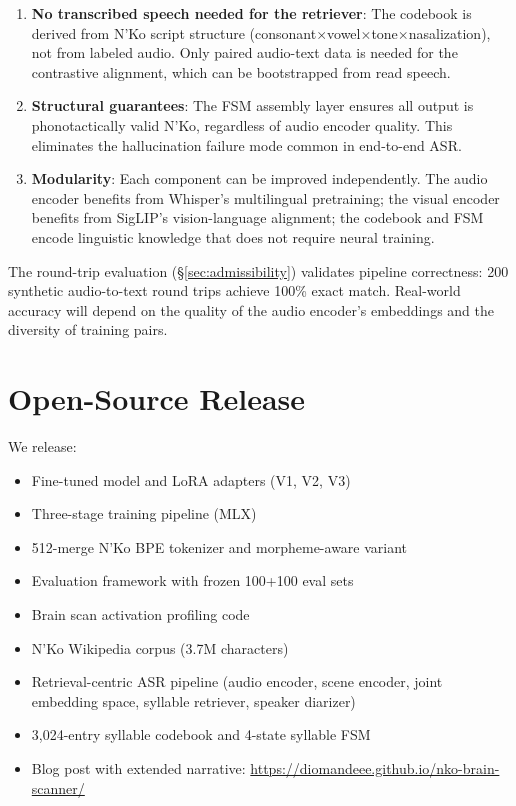 \documentclass[11pt]{article}
\begin{document}
\begin{enumerate}
\item \textbf{No transcribed speech needed for the retriever}: The codebook is derived from N'Ko script structure (consonant$\times$vowel$\times$tone$\times$nasalization), not from labeled audio. Only paired audio-text data is needed for the contrastive alignment, which can be bootstrapped from read speech.

\item \textbf{Structural guarantees}: The FSM assembly layer ensures all output is phonotactically valid N'Ko, regardless of audio encoder quality. This eliminates the hallucination failure mode common in end-to-end ASR.

\item \textbf{Modularity}: Each component can be improved independently. The audio encoder benefits from Whisper's multilingual pretraining; the visual encoder benefits from SigLIP's vision-language alignment; the codebook and FSM encode linguistic knowledge that does not require neural training.
\end{enumerate}

The round-trip evaluation (\S\ref{sec:admissibility}) validates pipeline correctness: 200 synthetic audio-to-text round trips achieve 100\% exact match. Real-world accuracy will depend on the quality of the audio encoder's embeddings and the diversity of training pairs.

\section{Open-Source Release}
\label{sec:release}

We release:
\begin{itemize}
\item Fine-tuned model and LoRA adapters (V1, V2, V3)
\item Three-stage training pipeline (MLX)
\item 512-merge N'Ko BPE tokenizer and morpheme-aware variant
\item Evaluation framework with frozen 100+100 eval sets
\item Brain scan activation profiling code
\item N'Ko Wikipedia corpus (3.7M characters)
\item Retrieval-centric ASR pipeline (audio encoder, scene encoder, joint embedding space, syllable retriever, speaker diarizer)
\item 3,024-entry syllable codebook and 4-state syllable FSM
\item Blog post with extended narrative: \url{https://diomandeee.github.io/nko-brain-scanner/}
\end{itemize}
\end{document}
